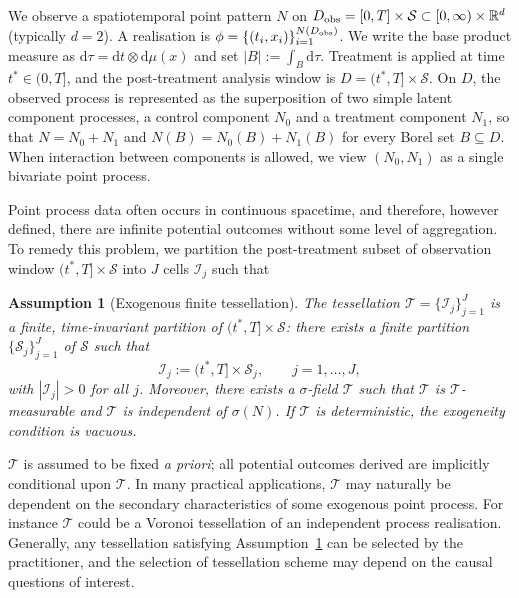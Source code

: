 \documentclass{statsoc}
\newtheorem{assumption}[assumption]{Assumption}
\newcommand{\dd}{\mathrm{d}}
\newcommand{\1}{\mathbbm{1}}
\newcommand{\Tsig}{\mathscr T}
\newcommand{\Nproc}{N}
\newcommand{\Nzero}{N_0}
\newcommand{\None}{N_1}
\begin{document}
We observe a spatiotemporal point pattern \(\Nproc\) on \(D_{\rm obs}=[0,T]\times\mathcal S\subset [0,\infty)\times\mathbb R^d\) (typically \(d=2\)). A realisation is \(\phi=\{(t_i,x_i)\}_{i=1}^{\Nproc(D_{\rm obs})}\). We write the base product measure as \(\dd\tau=\dd t\otimes\dd\mu(x)\) and set \(|B|:=\int_B \dd\tau\). Treatment is applied at time \(t^\ast\in(0,T]\), and the post-treatment analysis window is \(D=(t^\ast,T]\times\mathcal S\). On \(D\), the observed process is represented as the superposition of two simple latent component processes, a control component \(\Nzero\) and a treatment component \(\None\), so that \(\Nproc=\Nzero+\None\) and \(\Nproc(B)=\Nzero(B)+\None(B)\) for every Borel set \(B\subseteq D\). When interaction between components is allowed, we view \((\Nzero,\None)\) as a single bivariate point process.

Point process data often occurs in continuous spacetime, and therefore, however defined, there are infinite potential outcomes without some level of aggregation. To remedy this problem, we partition the post-treatment subset of observation window $(t^\ast,T]\times \mathcal{S}$ into $J$ cells $\mathcal{I}_j$ such that

\begin{assumption}[Exogenous finite tessellation]\label{ass:tessellation}
The tessellation $\mathcal T=\{\mathcal I_j\}_{j=1}^J$ is a finite, time-invariant partition of $(t^\ast,T]\times\mathcal S$: there exists a finite partition $\{\mathcal S_j\}_{j=1}^J$ of $\mathcal S$ such that
\[
\mathcal I_j := (t^\ast,T]\times \mathcal S_j,\qquad j=1,\ldots,J,
\]
with $|\mathcal I_j|>0$ for all $j$. Moreover, there exists a $\sigma$-field $\Tsig$ such that $\mathcal T$ is $\Tsig$-measurable and $\Tsig$ is independent of $\sigma(\Nproc)$. If $\mathcal T$ is deterministic, the exogeneity condition is vacuous.
\end{assumption}

$\mathcal{T}$ is assumed to be fixed \textit{a priori}; all potential outcomes derived are implicitly conditional upon $\mathcal{T}$. In many practical applications, $\mathcal{T}$ may naturally be dependent on the secondary characteristics of some exogenous point process. For instance $\mathcal{T}$ could be a Voronoi tessellation of an independent process realisation. Generally, any tessellation satisfying Assumption~\ref{ass:tessellation} can be selected by the practitioner, and the selection of tessellation scheme may depend on the causal questions of interest. 
\end{document}
